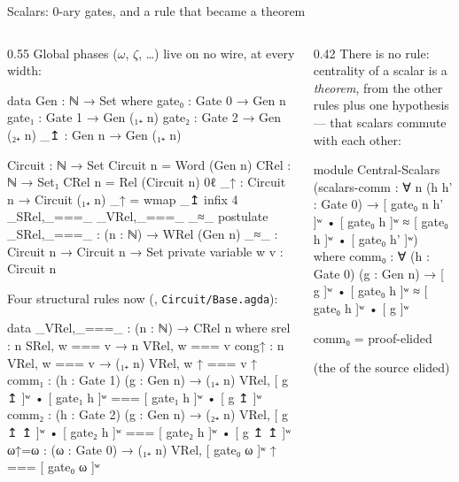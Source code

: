 \begin{frame}{Scalars: 0-ary gates, and a rule that became a theorem \New}
\begin{columns}[c]
\begin{column}{0.55\textwidth}
\small Global phases ($\omega$, $\zeta$, \ldots) live on no wire, at every width:
\begin{code}
data Gen : ℕ → Set where
  gate₀ : Gate 0 → Gen n
  gate₁ : Gate 1 → Gen (₁₊ n)
  gate₂ : Gate 2 → Gen (₂₊ n)
  _↥   : Gen n → Gen (₁₊ n)
\end{code}
\begin{code}[hide]
Circuit : ℕ → Set
Circuit n = Word (Gen n)
CRel : ℕ → Set₁
CRel n = Rel (Circuit n) 0ℓ
_↑ : Circuit n → Circuit (₁₊ n)
_↑ = wmap _↥
infix 4 _SRel,_===_ _VRel,_===_ _≈_
postulate
  _SRel,_===_ : (n : ℕ) → WRel (Gen n)
  _≈_ : Circuit n → Circuit n → Set
private variable
  w v : Circuit n
\end{code}
\vspace{-6pt}
\small Four structural rules now (, \texttt{Circuit/Base.agda}):
\begin{code}
data _VRel,_===_ : (n : ℕ) → CRel n where
  srel  : n SRel, w === v → n VRel, w === v
  cong↑ : n VRel, w === v → (₁₊ n) VRel, w ↑ === v ↑
  comm₁ : (h : Gate 1) (g : Gen n) → (₁₊ n) VRel,
          [ g ↥ ]ʷ • [ gate₁ h ]ʷ === [ gate₁ h ]ʷ • [ g ↥ ]ʷ
  comm₂ : (h : Gate 2) (g : Gen n) → (₂₊ n) VRel,
          [ g ↥ ↥ ]ʷ • [ gate₂ h ]ʷ === [ gate₂ h ]ʷ • [ g ↥ ↥ ]ʷ
  ω↑=ω : (ω : Gate 0) → (₁₊ n) VRel, [ gate₀ ω ]ʷ ↑ === [ gate₀ ω ]ʷ
\end{code}
\end{column}
\begin{column}{0.42\textwidth}
\renewcommand{\AgdaCodeStyle}{\scriptsize}
\small There is \alert{no}  rule: centrality of a scalar is a
\emph{theorem}, from the other rules plus one hypothesis --- that scalars
commute with each other:
\begin{code}
module Central-Scalars
  (scalars-comm : ∀ {n} (h h' : Gate 0) →
     [ gate₀ {n} h' ]ʷ • [ gate₀ h ]ʷ
       ≈ [ gate₀ h ]ʷ • [ gate₀ h' ]ʷ)
  where
  comm₀ : ∀ (h : Gate 0) (g : Gen n) →
          [ g ]ʷ • [ gate₀ h ]ʷ ≈ [ gate₀ h ]ʷ • [ g ]ʷ
\end{code}
\begin{code}[hide]
  comm₀ = proof-elided
\end{code}
{\scriptsize (the  of the source elided)}


\end{column}
\end{columns}
\end{frame}
